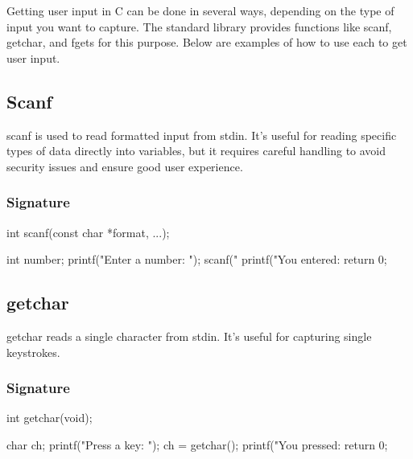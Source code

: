 \documentclass{report}
\begin{document}
        \pagebreak 
        \bigbreak \noindent 
        \begin{concept}
            Getting user input in C can be done in several ways, depending on the type of input you want to capture. The standard library provides functions like scanf, getchar, and fgets for this purpose. Below are examples of how to use each to get user input.
        \end{concept}
        \bigbreak \noindent 
        \subsection{Scanf}
        \bigbreak \noindent 
        scanf is used to read formatted input from stdin. It's useful for reading specific types of data directly into variables, but it requires careful handling to avoid security issues and ensure good user experience.
        \bigbreak \noindent 
        \subsubsection{Signature}
        \bigbreak \noindent 
        \begin{cppcode}
        int scanf(const char *format, ...);
        \end{cppcode}
        \bigbreak \noindent 
        \begin{cppcode}
            int number;
            printf("Enter a number: ");
            scanf("%
            printf("You entered: %
            return 0;
        \end{cppcode}
        \bigbreak \noindent 
        \bigbreak \noindent 
        \subsection{getchar}
        \bigbreak \noindent 
        getchar reads a single character from stdin. It's useful for capturing single keystrokes.
        \bigbreak \noindent 
        \subsubsection{Signature}
        \bigbreak \noindent 
        \begin{cppcode}
        int getchar(void);
        \end{cppcode}
        \bigbreak \noindent 
        \begin{cppcode}
            char ch;
            printf("Press a key: ");
            ch = getchar();
            printf("You pressed: %
            return 0;
        \end{cppcode}
\end{document}
